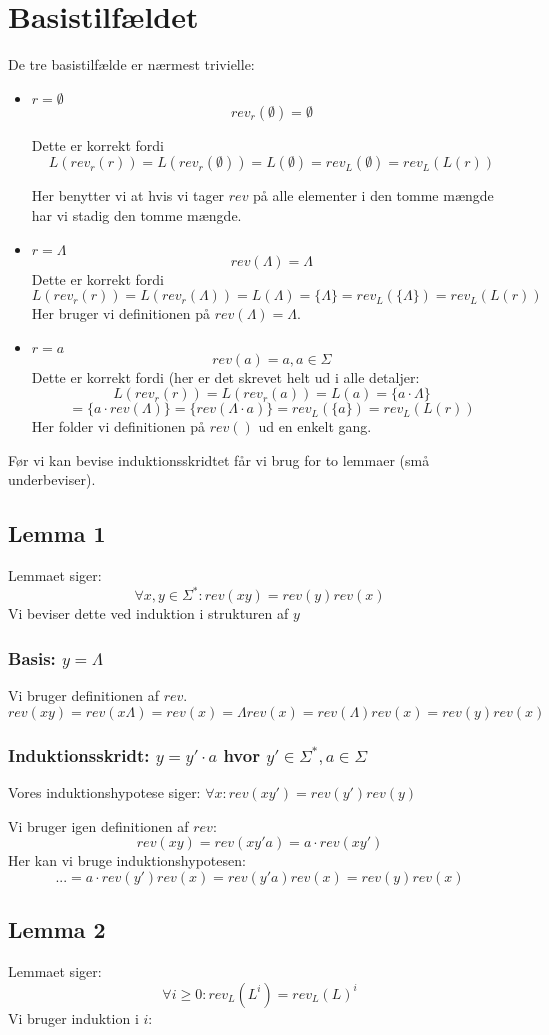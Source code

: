 \documentclass[11pt,a4paper]{article}
\begin{document}
\section{Basistilfældet}
De tre basistilfælde er nærmest trivielle:
\begin{itemize}
\item $r = \emptyset$
\[rev_r(\emptyset) = \emptyset\]

Dette er korrekt fordi
\[L(rev_r(r)) = L(rev_r(\emptyset)) = L(\emptyset) = rev_L(\emptyset) = rev_L(L(r)) \] 

Her
benytter vi at hvis vi tager $rev$ på alle elementer i den tomme
mængde har vi stadig den tomme mængde.
\item $r = \Lambda$
\[rev(\Lambda) = \Lambda\]
Dette er korrekt fordi
\[L(rev_r(r)) = L(rev_r(\Lambda)) = L(\Lambda) = \{\Lambda\} =rev_L(\{\Lambda\})
 = rev_L(L(r)) \]
 Her bruger vi definitionen på $rev(\Lambda)=\Lambda$.
\item $r = a$
\[rev(a) = a,a\in\Sigma\]
Dette er korrekt fordi (her er det skrevet helt ud i alle detaljer:
\[L(rev_r(r)) = L(rev_r(a)) = L(a) = \{a\cdot\Lambda\} \]
\[= \{a \cdot rev(\Lambda)\} = 
\{rev(\Lambda \cdot a)\} =
rev_L(\{a\})
 = rev_L(L(r)) \]
Her folder vi definitionen på $rev()$ ud en enkelt gang.
\end{itemize}
Før vi kan bevise induktionsskridtet får vi brug for to lemmaer (små
underbeviser).
\subsection{Lemma 1}
Lemmaet siger:
\[\forall x,y \in \Sigma^*: rev(xy) = rev(y)rev(x)\]
Vi beviser dette ved induktion i strukturen af $y$
\subsubsection{Basis: $y=\Lambda$}
Vi bruger definitionen af $rev$.
\[rev(xy) = rev(x\Lambda) = rev(x) = \Lambda rev(x) = rev(\Lambda)rev(x) = rev(y)rev(x)\]
\subsubsection{Induktionsskridt: $y = y'\cdot a$ hvor $y'\in \Sigma^*, a\in \Sigma$}
Vores induktionshypotese siger: $\forall x: rev(xy') = rev(y')rev(y)$

Vi bruger igen definitionen af $rev$:
\[rev(xy) = rev(xy'a) = a\cdot rev(xy')\]
Her kan vi bruge induktionshypotesen:
\[... = a\cdot rev(y')rev(x) = rev(y'a)rev(x) = rev(y)rev(x)\]
\subsection{Lemma 2}
Lemmaet siger:
\[\forall i\geq 0: rev_L(L^i) = rev_L(L)^i\]
Vi bruger induktion i $i$:
\end{document}
